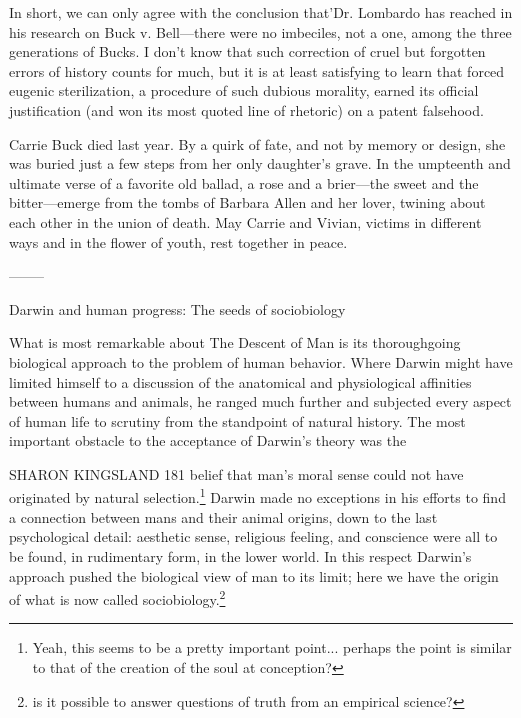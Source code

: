 \documentclass[12pt]{letter}
\begin{document}
In short, we can only agree with the conclusion that’Dr. Lombardo has reached in his
research on Buck v. Bell—there were no imbeciles, not a one, among the three
generations of Bucks. I don’t know that such correction of cruel but forgotten errors of
history counts for much, but it is at least satisfying to learn that forced eugenic
sterilization, a procedure of such dubious morality, earned its official justification (and
won its most quoted line of rhetoric) on a patent falsehood.

Carrie Buck died last year. By a quirk of fate, and not by memory or design, she was
buried just a few steps from her only daughter’s grave. In the umpteenth and ultimate
verse of a favorite old ballad, a rose and a brier—the sweet and the bitter—emerge from
the tombs of Barbara Allen and her lover, twining about each other in the union of death.
May Carrie and Vivian, victims in different ways and in the flower of youth, rest together
in peace.


--------

Darwin and human progress: The seeds of sociobiology

What is most remarkable about The Descent of Man is its thoroughgoing biological approach to the problem of human behavior. Where Darwin might have limited himself to a discussion of the anatomical and physiological affinities between humans and animals, he ranged much further and subjected every aspect of human life to scrutiny from the standpoint of natural history. The most important obstacle to the acceptance of Darwin’s theory was the


SHARON KINGSLAND 181
belief that man's moral sense could not have originated by natural selection.\footnote{Yeah, this seems to be a pretty important point... perhaps the point is similar to that of the creation of the soul at conception?} Darwin made no exceptions in his efforts to find a connection between mans and their animal origins, down to the last psychological detail: aesthetic sense, religious feeling, and conscience were all to be found, in rudimentary form, in the lower world. In this respect Darwin's approach pushed the biological view of man to its limit; here we have the origin of what is now called sociobiology.\footnote{is it possible to answer questions of truth from an empirical science?}
\end{document}
